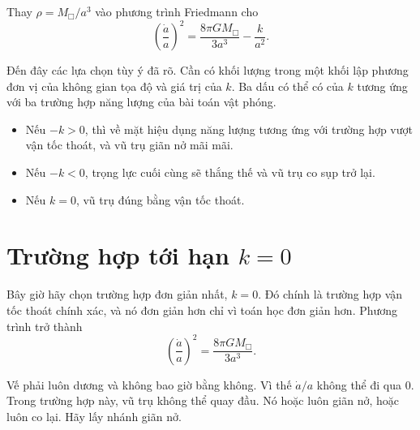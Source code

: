 Thay \(\rho=M_{\Box}/a^3\) vào phương trình Friedmann cho
\begin{equation}
\left(\frac{\dot a}{a}\right)^2=\frac{8\pi G M_{\Box}}{3a^3}-\frac{k}{a^2}.
\end{equation}

Đến đây các lựa chọn tùy ý đã rõ. Cần có khối lượng trong một khối lập phương đơn vị của không gian tọa độ và giá trị của \(k\). Ba dấu có thể có của \(k\) tương ứng với ba trường hợp năng lượng của bài toán vật phóng.

\begin{itemize}
\item Nếu \(-k>0\), thì về mặt hiệu dụng năng lượng tương ứng với trường hợp vượt vận tốc thoát, và vũ trụ giãn nở mãi mãi.
\item Nếu \(-k<0\), trọng lực cuối cùng sẽ thắng thế và vũ trụ co sụp trở lại.
\item Nếu \(k=0\), vũ trụ đúng bằng vận tốc thoát.
\end{itemize}

\begin{classroomqa}
\end{classroomqa}

\section{Trường hợp tới hạn \(k=0\)}

Bây giờ hãy chọn trường hợp đơn giản nhất, \(k=0\). Đó chính là trường hợp vận tốc thoát chính xác, và nó đơn giản hơn chỉ vì toán học đơn giản hơn. Phương trình trở thành
\begin{equation}
\left(\frac{\dot a}{a}\right)^2=\frac{8\pi G M_{\Box}}{3a^3}.
\end{equation}

Vế phải luôn dương và không bao giờ bằng không. Vì thế \(\dot a/a\) không thể đi qua 0. Trong trường hợp này, vũ trụ không thể quay đầu. Nó hoặc luôn giãn nở, hoặc luôn co lại. Hãy lấy nhánh giãn nở.


